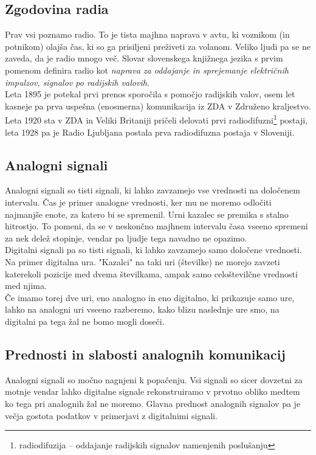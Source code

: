 \documentclass[12pt]{article}
\begin{document}
    \subsection{Zgodovina radia}
        Prav vsi poznamo radio. To je tista majhna naprava v avtu, ki 
        voznikom (in potnikom) olajša čas, ki so ga prisiljeni preživeti za
        volanom. Veliko ljudi pa se ne zaveda, da je radio mnogo več. Slovar
        slovenskega knjižnega jezika s prvim pomenom definira radio
        kot \textit{naprava za oddajanje in sprejemanje električnih 
        impulzov, signalov po radijskih valovih}. \cite{SSKJ-radio}\\
        Leta 1895 \cite{ppt} je potekal prvi prenos sporočila s pomočjo 
        radijskih valov, osem let kasneje pa prva uspešna (enosmerna) 
        komunikacija iz ZDA v Združeno kraljestvo. Leta 1920 sta v ZDA in 
        Veliki Britaniji pričeli delovati prvi radiodifuzni\footnote{
        radiodifuzija – oddajanje radijskih signalov namenjenih poslušanju} 
        postaji, leta 1928 pa je Radio Ljubljana postala prva radiodifuzna 
        postaja v Sloveniji.
    \subsection{Analogni signali}
        Analogni signali so tisti signali, ki lahko zavzamejo vse vrednosti
        na določenem intervalu. Čas je primer analogne vrednosti, ker mu ne
        moremo odločiti najmanjše enote, za katero bi se spremenil. Urni
        kazalec se premika s stalno hitrostjo. To pomeni, da se v neskončno
        majhnem intervalu časa vseeno spremeni za nek delež stopinje, vendar
        pa ljudje tega navadno ne opazimo.\\
        Digitalni signali pa so tisti signali, ki lahko zavzamejo samo 
        določene vrednosti. Na primer digitalna ura. "Kazalci" na taki uri 
        (številke) ne morejo zavzeti katerekoli pozicije med dvema 
        številkama, ampak samo celoštevilčne vrednosti med njima.\\
        Če imamo torej dve uri, eno analogno in eno digitalno, ki prikazuje
        samo ure, lahko na analogni uri vseeno razberemo, kako blizu 
        naslednje ure smo, na digitalni pa tega žal ne bomo mogli doseči.
    \subsection{Prednosti in slabosti analognih komunikacij}
        Analogni signali so močno nagnjeni k popačenju. Vsi signali so sicer 
        dovzetni za motnje vendar lahko digitalne signale rekonstruiramo v 
        prvotno obliko medtem ko tega pri analognih žal ne moremo. Glavna 
        prednost analognih signalov pa je večja gostota podatkov v primerjavi z
        digitalnimi signali.
\end{document}

